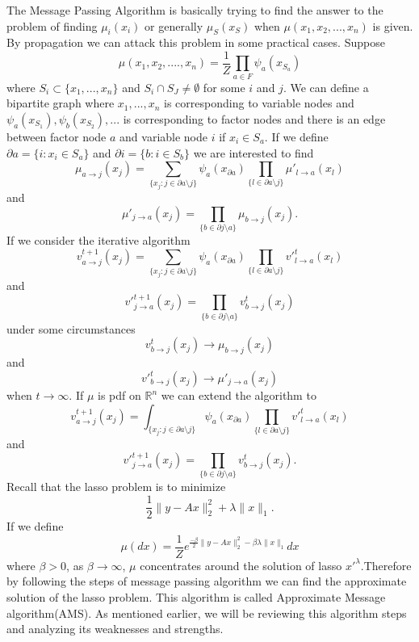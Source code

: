\documentclass[12pt, leqno]{article}
\begin{document}
The Message Passing Algorithm is basically trying to find the answer to the
problem of finding $\mu_i (x_i )$  or generally $\mu_S (x_S )$ when
$\mu(x_1 ,x_2 ,...,x_n)$ is given. By propagation we can attack this
problem in some practical cases. Suppose $$\mu(x_1 ,x_2 ,....,x_n
)=\frac{1}{Z}\prod_{a\in F}\psi_{a}(x_{S_{a}})$$ where $S_i \subset
\{x_1 ,...,x_n \}$ and $S_i \cap S_J \neq \emptyset$ for some $ i$ and
$j$. We can define a bipartite graph where $x_1 ,...,x_n$ is
corresponding to variable nodes and
$\psi_{a}(x_{S_{1}}),\psi_{b}(x_{S_{2}}),...$ is corresponding to
factor nodes and there is an edge between factor node $a$ and variable
node $i$ if $x_i \in S_a$. If we define $\partial a=\{i:x_i \in S_a \}
$ and $\partial i=\{b:i \in S_b \} $  we are interested to find 
$$\mu_{a\rightarrow j}(x_j )= \sum_{\{x_j
:j\in \partial a\setminus j\}}\psi_{a}(x_{\partial
a})\prod_{\{l\in \partial a\setminus j\}}\mu'_{l\rightarrow a}(x_l )$$
and 
$$\mu'_{j\rightarrow a}(x_j )=\prod_{\{b\in \partial j\setminus
  a\}}\mu_{b\rightarrow j}(x_j ).$$
If we consider the iterative algorithm $$v^{t+1}_{a\rightarrow j}(x_j )= \sum_{\{x_j
:j\in \partial a\setminus j\}}\psi_{a}(x_{\partial
a})\prod_{\{l\in \partial a\setminus j\}}{v'}^{t}_{l\rightarrow a}(x_l
)$$ 
and 
$${v'}^{t+1}_{j\rightarrow a}(x_j )=\prod_{\{b\in \partial j\setminus
  a\}}v^{t}_{b\rightarrow j}(x_j )$$ 
under some circumstances 
$$v^{t}_{b\rightarrow j}(x_j )\rightarrow \mu_{b\rightarrow j}(x_j )$$ 
and 
$${v'}^{t}_{b\rightarrow j}(x_j )\rightarrow \mu'_{j\rightarrow a}(x_j )$$ when $t\rightarrow \infty$.
If $\mu$ is pdf on $\mathbb{R}^n$ we can extend the algorithm to 
$$v^{t+1}_{a\rightarrow j}(x_j )= \int_{\{x_j
:j\in \partial a\setminus j\}}\psi_{a}(x_{\partial
a})\prod_{\{l\in \partial a\setminus j\}}{v'}^{t}_{l\rightarrow a}(x_l
)$$ 
and 
$${v'}^{t+1}_{j\rightarrow a}(x_j )=\prod_{\{b\in \partial j\setminus
  a\}}v^{t}_{b\rightarrow j}(x_j ).$$
Recall that the lasso problem is to minimize $$\frac{1}{2}\parallel
y-Ax\parallel^{2}_{2}+\lambda\parallel x\parallel_{1}.$$ If we
define $$\mu (dx)=\frac{1}{Z}e^{\frac{-\beta}{2}\parallel
  y-Ax\parallel^{2}_{2}-\beta\lambda\parallel x\parallel_{1}}dx$$
where $\beta>0$, as $\beta\rightarrow \infty$, $\mu$ concentrates
around the solution of lasso ${x'}^{\lambda}$.Therefore by following the
steps of message passing algorithm we can find the approximate
solution of the lasso problem. This algorithm is called Approximate
Message algorithm(AMS). As mentioned earlier, we will be reviewing this algorithm
steps and analyzing its weaknesses and strengths.
\end{document}
